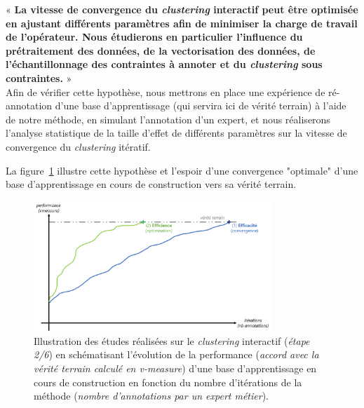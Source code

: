 	\begin{tcolorbox}[
		title=\faVial~\textbf{Hypothèse d'efficience}~\faVial,
		colback=colorTcolorboxHypothesis!15,
		colframe=colorTcolorboxHypothesis!75,
		width=\linewidth
	]

		« \textbf{
			La vitesse de convergence du \textit{clustering} interactif peut être optimisée en ajustant différents paramètres afin de minimiser la charge de travail de l'opérateur. Nous étudierons en particulier l'influence du prétraitement des données, de la vectorisation des données, de l'échantillonnage des contraintes à annoter et du \textit{clustering} sous contraintes.
		} » \\
		
		Afin de vérifier cette hypothèse, nous mettrons en place une expérience de ré-annotation d'une base d'apprentissage (qui servira ici de vérité terrain) à l'aide de notre méthode, en simulant l'annotation d'un expert, et nous réaliserons l'analyse statistique de la taille d'effet de différents paramètres sur la vitesse de convergence du \textit{clustering} itératif.
		
		La figure~\ref{figure:4.2-HYPOTHESE-EFFICIENCE} illustre cette hypothèse et l'espoir d'une convergence "optimale" d'une base d'apprentissage en cours de construction vers sa vérité terrain.
		\begin{figure}[H]
			\centering
			\includegraphics[width=0.8\textwidth]{figures/hypotheses-02-efficience}
			\caption{Illustration des études réalisées sur le \textit{clustering} interactif (\textit{étape 2/6}) en schématisant l'évolution de la performance (\textit{accord avec la vérité terrain calculé en v-measure}) d'une base d'apprentissage en cours de construction en fonction du nombre d'itérations de la méthode (\textit{nombre d'annotations par un expert métier}).}
			\label{figure:4.2-HYPOTHESE-EFFICIENCE}
		\end{figure}

	\end{tcolorbox}
	
